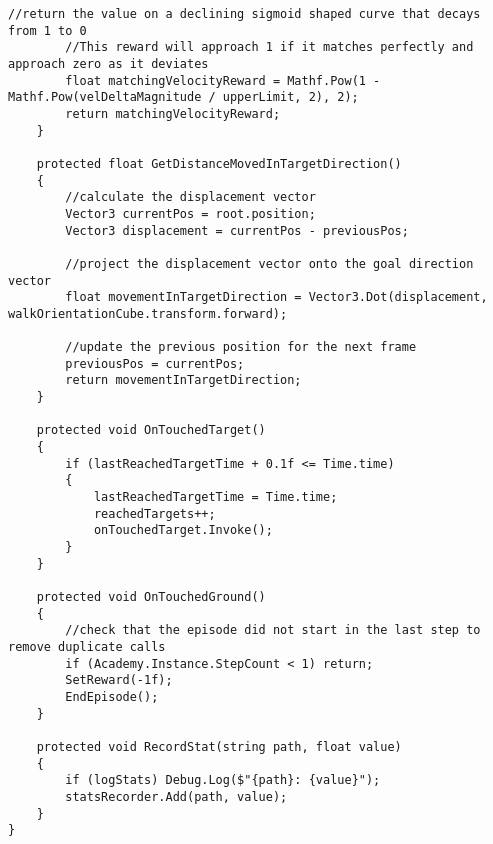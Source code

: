 \begin{lstlisting}[caption={Agenten Skript},captionpos=b,label={lst:skript_agent1}]
        //return the value on a declining sigmoid shaped curve that decays from 1 to 0
        //This reward will approach 1 if it matches perfectly and approach zero as it deviates
        float matchingVelocityReward = Mathf.Pow(1 - Mathf.Pow(velDeltaMagnitude / upperLimit, 2), 2);
        return matchingVelocityReward;
    }

    protected float GetDistanceMovedInTargetDirection()
    {
        //calculate the displacement vector
        Vector3 currentPos = root.position;
        Vector3 displacement = currentPos - previousPos;

        //project the displacement vector onto the goal direction vector
        float movementInTargetDirection = Vector3.Dot(displacement, walkOrientationCube.transform.forward);

        //update the previous position for the next frame
        previousPos = currentPos;
        return movementInTargetDirection;
    }

    protected void OnTouchedTarget()
    {
        if (lastReachedTargetTime + 0.1f <= Time.time)
        {
            lastReachedTargetTime = Time.time;
            reachedTargets++;
            onTouchedTarget.Invoke();
        }
    }

    protected void OnTouchedGround()
    {
        //check that the episode did not start in the last step to remove duplicate calls
        if (Academy.Instance.StepCount < 1) return;
        SetReward(-1f);
        EndEpisode();
    }

    protected void RecordStat(string path, float value)
    {
        if (logStats) Debug.Log($"{path}: {value}");
        statsRecorder.Add(path, value);
    }
}
\end{lstlisting}

